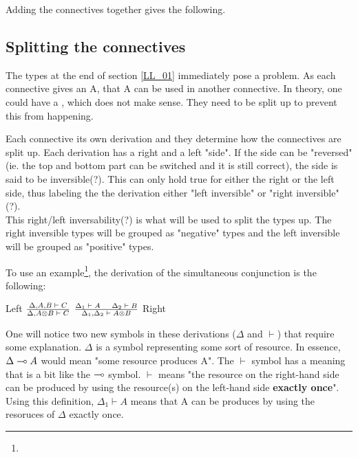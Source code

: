 Adding the connectives together gives the following.

\subsection{Splitting the connectives}
\label{LL_02}

The types at the end of section \ref{LL_01} immediately pose a problem. As each connective gives an A, that A can be used in another connective. In theory, one could have a , which does not make sense. They need to be split up to prevent this from happening.

Each connective its own derivation and they determine how the connectives are split up. Each derivation has a right and a left "side". If the side can be "reversed" (ie. the top and bottom part can be switched and it is still correct), the side is said to be inversible(?). This can only hold true for either the right or the left side, thus labeling the the derivation either "left inversible" or "right inversible"(?).\\ 
This right/left inversability(?) is what will be used to split the types up. The right inversible types will be grouped as "negative" types and the left inversible will be grouped as "positive" types.

To use an example\footnote{}, the derivation of the simultaneous conjunction is the following:
\begin{texto}
	Left $\frac{\Delta , A, B \;\vdash\; C}{\Delta , A \otimes B \;\vdash\; C}$ \hspace{50pt}
	$\frac{\Delta_1 \;\vdash\; A \hspace{12pt} \Delta_2 \;\vdash\; B}{\Delta_1 , \Delta_2 \;\vdash\; A \otimes B}$ Right
\end{texto}
One will notice two new symbols in these derivations ($\Delta$ and $\vdash$) that require some explanation. $\Delta$ is a symbol representing some sort of resource. In essence, $\Delta \multimap A$ would mean "some resource produces A". The $\vdash$ symbol has a meaning that is a bit like the $\multimap$ symbol. $\vdash$ means "the resource on the right-hand side can be produced by using the resource(s) on the left-hand side \textbf{exactly once}". Using this definition, $\Delta_1 \vdash A$ means that A can be produces by using the resoruces of $\Delta$ exactly once.

